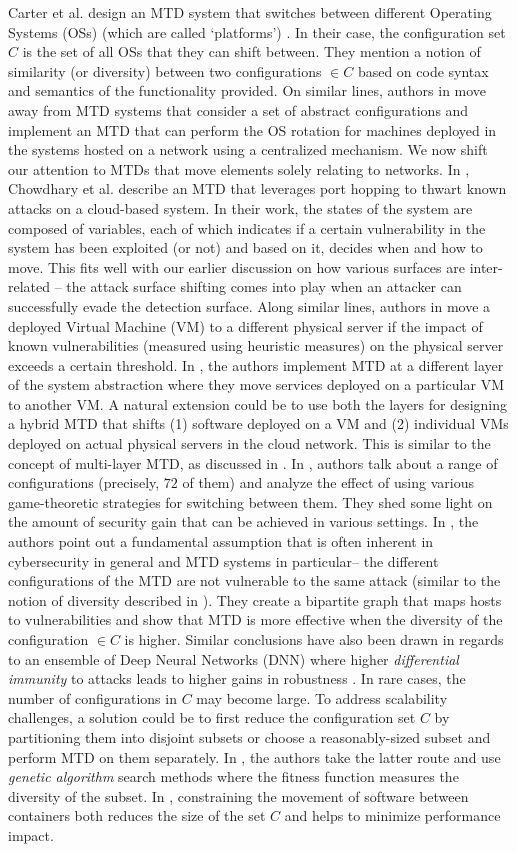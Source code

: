 Carter et al. design an MTD system that switches between different Operating Systems (OSs) (which are called `platforms') . In their case, the configuration set $C$ is the set of all OSs that they can shift between. They mention a notion of similarity (or diversity) between two configurations $\in C$ based on code syntax and semantics of the functionality provided. On similar lines, authors in  move away from MTD systems that consider a set of abstract configurations and implement an MTD that can perform the OS rotation for machines deployed in the systems hosted on a network using a centralized mechanism. We now shift our attention to MTDs that move elements solely relating to networks.
In , Chowdhary et al. describe an MTD that leverages port hopping to thwart known attacks on a cloud-based system. In their work, the states of the system are composed of variables, each of which indicates if a certain vulnerability in the system has been exploited (or not) and based on it, decides when and how to move. This fits well with our earlier discussion on how various surfaces are inter-related -- the attack surface shifting comes into play when an attacker can successfully evade the detection surface. Along similar lines, authors in  move a deployed Virtual Machine (VM) to a different physical server if the impact of known vulnerabilities (measured using heuristic measures) on the physical server exceeds a certain threshold. In , the authors implement MTD at a different layer of the system abstraction where they move services deployed on a particular VM to another VM. A natural extension could be to use both the layers for designing a hybrid MTD that shifts (1) software deployed on a VM and (2) individual VMs deployed on actual physical servers in the cloud network. This is similar to the concept of multi-layer MTD, as discussed in .
In , authors talk about a range of configurations (precisely, $72$ of them) and analyze the effect of using various game-theoretic strategies for switching between them. They shed some light on the amount of security gain that can be achieved in various settings. In , the authors point out a fundamental assumption that is often inherent in cybersecurity in general and MTD systems in particular-- the different configurations of the MTD are not vulnerable to the same attack (similar to the notion of diversity described in ). They create a bipartite graph that maps hosts to vulnerabilities and show that MTD is more effective when the diversity of the configuration $\in C$ is higher. Similar conclusions have also been drawn in regards to an ensemble of Deep Neural Networks (DNN) where higher {\em differential immunity} to attacks leads to higher gains in robustness .
In rare cases, the number of configurations in $C$ may become large. To address scalability challenges, a solution could be to first reduce the configuration set $C$ by partitioning them into disjoint subsets  or choose a reasonably-sized subset and perform MTD on them separately. In , the authors take the latter route and use \textit{genetic algorithm} search methods where the fitness function measures the diversity of the subset. In , constraining the movement of software between containers both reduces the size of the set $C$ and helps to minimize performance impact.

